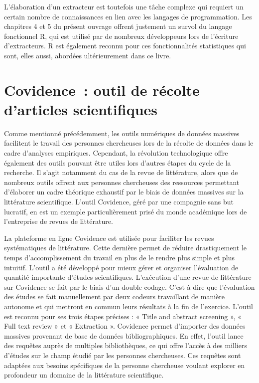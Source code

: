 \documentclass[
  letterpaper,
]{scrbook}
\begin{document}
L'élaboration d'un extracteur est toutefois une tâche complexe qui
requiert un certain nombre de connaissances en lien avec les langages de
programmation. Les chapitres 4 et 5 du présent ouvrage offrent justement
un survol du langage fonctionnel R, qui est utilisé par de nombreux
développeurs lors de l'écriture d'extracteurs. R est également reconnu
pour ces fonctionnalités statistiques qui sont, elles aussi, abordées
ultérieurement dans ce livre.

\hypertarget{covidence-outil-de-ruxe9colte-darticles-scientifiques}{%
\section{\texorpdfstring{\textbf{Covidence~: outil de récolte d'articles
scientifiques}}{Covidence~: outil de récolte d'articles scientifiques}}\label{covidence-outil-de-ruxe9colte-darticles-scientifiques}}

Comme mentionné précédemment, les outils numériques de données massives
facilitent le travail des personnes chercheuses lors de la récolte de
données dans le cadre d'analyses empiriques. Cependant, la révolution
technologique offre également des outils pouvant être utiles lors
d'autres étapes du cycle de la recherche. Il s'agit notamment du cas de
la revue de littérature, alors que de nombreux outils offrent aux
personnes chercheuses des ressources permettant d'élaborer un cadre
théorique exhaustif par le biais de données massives sur la littérature
scientifique. L'outil Covidence, géré par une compagnie sans but
lucratif, en est un exemple particulièrement prisé du monde académique
lors de l'entreprise de revues de littérature.

La plateforme en ligne Covidence est utilisée pour faciliter les revues
systématiques de littérature. Cette dernière permet de réduire
drastiquement le temps d'accomplissement du travail en plus de le rendre
plus simple et plus intuitif. L'outil a été développé pour mieux gérer
et organiser l'évaluation de quantité importante d'études scientifiques.
L'exécution d'une revue de littérature sur Covidence se fait par le
biais d'un double codage. C'est-à-dire que l'évaluation des études se
fait manuellement par deux codeurs travaillant de manière autonome et
qui mettront en commun leurs résultats à la fin de l'exercice. L'outil
est reconnu pour ses trois étapes précises : « Title and abstract
screening », « Full text review » et « Extraction ». Covidence permet
d'importer des données massives provenant de base de données
bibliographiques. En effet, l'outil lance des requêtes auprès de
multiples bibliothèques, ce qui offre l'accès à des milliers d'études
sur le champ étudié par les personnes chercheuses. Ces requêtes sont
adaptées aux besoins spécifiques de la personne chercheuse voulant
explorer en profondeur un domaine de la littérature scientifique.
\end{document}
